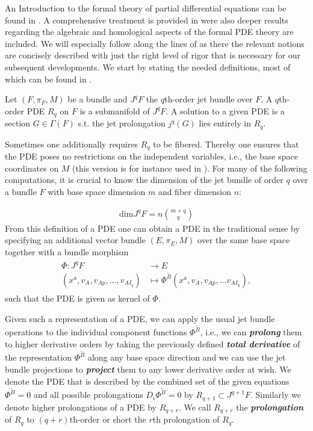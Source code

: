An Introduction to the formal theory of partial differential equations can be found in \cite{saunders_1989}. A comprehensive treatment is provided in \cite{seiler2009involution} were also deeper results regarding the algebraic and homological aspects of the formal PDE theory are included. We will especially follow along the lines of \cite{seiler1994analysis} as there the relevant notions are concisely described with just the right level of rigor that is necessary for our subsequent developments. We start by stating the needed definitions, most of which can be found in \cite{seiler1994analysis}.
\begin{definition}[PDE]
Let $(F,\pi_F,M)$ be a bundle and $J^qF$ the $q$th-order jet bundle over $F$. A $q$th-order PDE $R_q$ on $F$ is a  submanifold of $J^qF$. A solution to a given PDE is a section $G \in \Gamma(F)$ s.t. the jet prolongation $j^q(G)$ lies entirely in $R_q$.  
\end{definition}
Sometimes one additionally requires $R_q$ to be fibered. Thereby one ensures that the PDE poses no restrictions on the independent variables, i.e., the base space coordinates on $M$ (this version is for instance used in \cite{seiler1994analysis}).
For many of the following computations, it is crucial to know the dimension of the jet bundle of order $q$ over a bundle $F$ with base space dimension $m$ and fiber dimension $n$:

\begin{align}
    \mathrm{dim}J^qF = n\binom{m+q}{q}
\end{align}
From this definition of a PDE one can obtain a PDE in the traditional sense by specifying an additional vector bundle $(E,\pi_E,M)$ over the same base space together with a bundle morphism
\begin{align}
    \begin{aligned}
    \Phi : J^qF &\longrightarrow E\\
    (x^a, v_A, v_{Ap},...,v_{AI_q}) &\longmapsto \Phi^{\tilde{B}}(x^a, v_A, v_{Ap},...v_{AI_q}),
    \end{aligned}
\end{align}
such that the PDE is given as kernel of $\Phi$. 

Given such a representation of a PDE, we can apply the usual jet bundle operations to the individual component functions $\Phi^{\tilde{B}}$, i.e., we can \textit{\textbf{prolong}} them to higher derivative orders by taking the previously defined \textit{\textbf{total derivative}} of the representation $\Phi^{\tilde{B}}$ along any base space direction and we can use the jet bundle projections to \textit{\textbf{project}} them to any lower derivative order at wish. We denote the PDE that is described by the combined set of the given equations $\Phi^{\tilde{B}}=0$ and all possible prolongations $D_i\Phi^{\tilde{B}}=0$ by $R_{q+1} \subset J^{q+1}F$. Similarly we denote higher prolongations of a PDE by $R_{q+r}$. We call $R_{q+r}$ the \textit{\textbf{prolongation}} of $R_q$ to $(q+r)$th-order or short the $r$th prolongation of $R_q$. 

